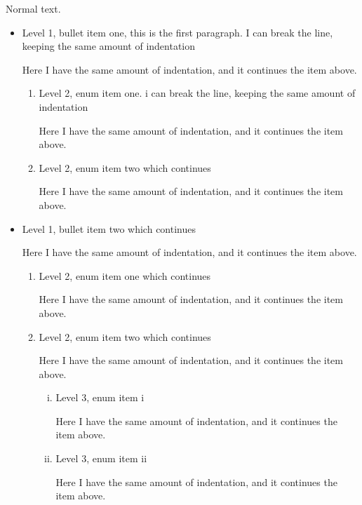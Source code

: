 \documentclass[DIV=12,%
               BCOR=0mm,%
               fontsize=10pt,%
               oneside,%
               paper=210mm:11in]{scrbook}
\begin{document}
Normal text.


\begin{itemize}
\item\relax 
Level 1, bullet item one, this is the first paragraph. I can break
the line, keeping the same amount of indentation


Here I have the same amount of indentation, and it continues the
item above.


\begin{enumerate}[1.]
\item\relax 
Level 2, enum item one. i can break the line, keeping the same
amount of indentation


Here I have the same amount of indentation, and it continues the
item above.



\item\relax 
Level 2, enum item two
which continues


Here I have the same amount of indentation, and it continues the
item above.




\end{enumerate}


\item\relax 
Level 1, bullet item two
which continues


Here I have the same amount of indentation, and it continues the
item above.


\begin{enumerate}[1.]
\item\relax 
Level 2, enum item one
which continues


Here I have the same amount of indentation, and it continues the
item above.



\item\relax 
Level 2, enum item two
which continues


Here I have the same amount of indentation, and it continues the
item above.


\begin{enumerate}[i.]
\item\relax 
Level 3, enum item i


Here I have the same amount of indentation, and it continues
the item above.



\item\relax 
Level 3, enum item ii


Here I have the same amount of indentation, and it continues
the item above.





\end{enumerate}
\end{enumerate}
\end{itemize}
\end{document}
